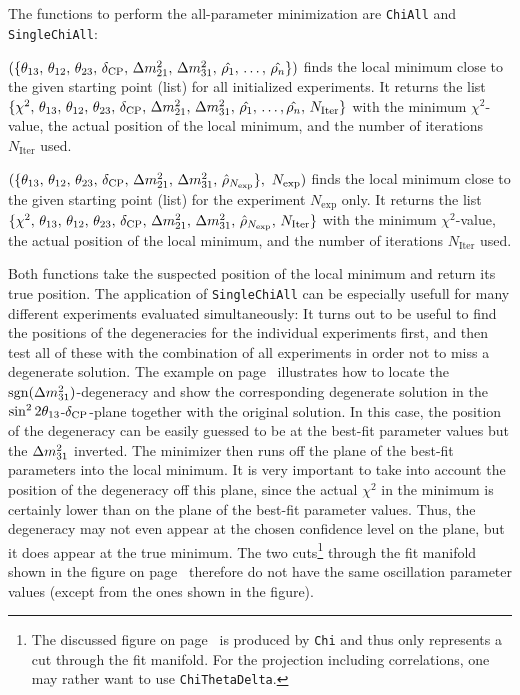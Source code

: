 The functions to perform the all-parameter minimization are {\tt ChiAll} and {\tt SingleChiAll}:
\begin{function}
$(\{ \theta_{13}, \, \theta_{12}, \, \theta_{23}, \, \delta_{\mathrm{CP}} , \, \Delta m_{21}^2 , \, \Delta m_{31}^2,  \, \hat{\rho_1}, \, \hdots , \, \hat{\rho_n} \})$ finds the local minimum close to the given starting point (list) for all initialized experiments. It returns the list  $\{ \chi^2, \, \theta_{13}, \, \theta_{12}, \, \theta_{23}, \, \delta_{\mathrm{CP}} , \, \Delta m_{21}^2 , \,  \Delta m_{31}^2,  \, \hat{\rho_1}, \, \hdots , \hat{\rho_n} , \, N_{\mathrm{Iter}} \}$ with the minimum $\chi^2$-value, the actual position of the local minimum, and the number of iterations $N_{\mathrm{Iter}}$ used.
\end{function}
\begin{function}
$( \{ \theta_{13}, \, \theta_{12}, \, \theta_{23}, \, \delta_{\mathrm{CP}} , \, \Delta m_{21}^2 , \, \Delta m_{31}^2, \,   \hat{\rho}_{N_{\mathrm{exp}}} \}, \, \, N_{\mathrm{exp}})$ finds the local minimum close to the given starting point (list) for the experiment $N_{\mathrm{exp}}$ only. It returns the list
 $\{ \chi^2, \, \theta_{13}, \, \theta_{12}, \, \theta_{23}, \, \delta_{\mathrm{CP}} , \, \Delta m_{21}^2 , \, \Delta m_{31}^2, \, \hat{\rho}_{N_{\mathrm{exp}}} ,  \, N_{\mathrm{Iter}} \}$ with the minimum $\chi^2$-value, the actual position of the local minimum, and the number of iterations $N_{\mathrm{Iter}}$ used.
\end{function}
%
Both functions take the suspected position of the local minimum and return its true position. The application of  {\tt SingleChiAll} can be especially usefull for many different experiments evaluated simultaneously: It turns out to be useful to find the positions of the degeneracies for the individual experiments first, and then test all of these with the combination of all experiments in order not to miss a degenerate solution. The example on page~\pageref{ex:sgndeg} illustrates how to locate the $\mathrm{sgn}(\Delta m_{31}^2)$-degeneracy and show the corresponding degenerate solution in the $\sin^2 2 \theta_{13}$-$\delta_{\mathrm{CP}}$-plane together with the original solution.
In this case, the position of the degeneracy can be easily guessed to be at the best-fit parameter values but the $\Delta m_{31}^2$ inverted. The minimizer then runs off the plane of the best-fit parameters into the local minimum. It is very important to take into account the position of the degeneracy off this plane, since the actual $\chi^2$ in the minimum is certainly lower than on the plane of the best-fit parameter values. Thus, the degeneracy may not even appear at the chosen confidence level on the plane, but it does appear at the true minimum. The two cuts\footnote{The discussed figure on page~\pageref{ex:sgndeg} is produced by  {\tt Chi} and thus only represents a cut through the fit manifold. For the projection including correlations, one may rather want to use {\tt ChiThetaDelta}.} through the fit manifold shown in the figure on page~\pageref{ex:sgndeg} therefore do not have the same oscillation parameter values (except from the ones shown in the figure). 

